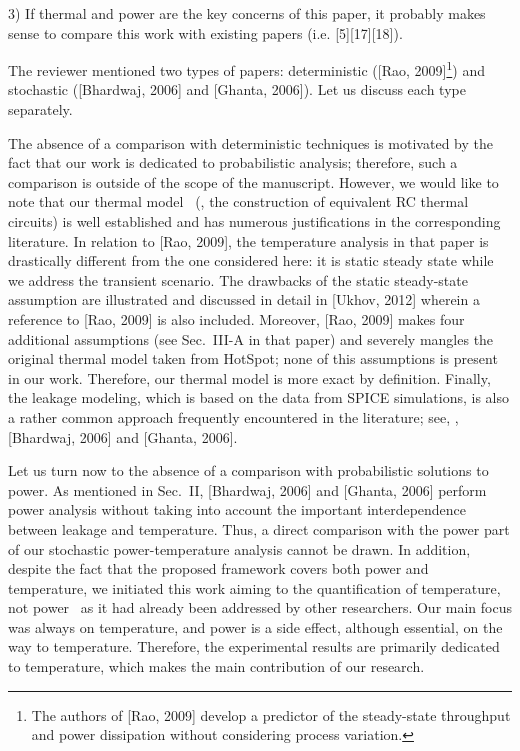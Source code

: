 \begin{reviewer}
3) If thermal and power are the key concerns of this paper, it probably makes sense to compare this work with existing papers (i.e. [5][17][18]).
\end{reviewer}
\begin{authors}
The reviewer mentioned two types of papers: deterministic ([Rao, 2009]\footnote{The authors of [Rao, 2009] develop a predictor of the steady-state throughput and power dissipation without considering process variation.}) and stochastic ([Bhardwaj, 2006] and [Ghanta, 2006]).
Let us discuss each type separately.

The absence of a comparison with deterministic techniques is motivated by the fact that our work is dedicated to probabilistic analysis; therefore, such a comparison is outside of the scope of the manuscript.
However, we would like to note that our thermal model \perse\ (\ie, the construction of equivalent RC thermal circuits) is well established and has numerous justifications in the corresponding literature.
In relation to [Rao, 2009], the temperature analysis in that paper is drastically different from the one considered here: it is static steady state while we address the transient scenario.
The drawbacks of the static steady-state assumption are illustrated and discussed in detail in [Ukhov, 2012] wherein a reference to [Rao, 2009] is also included.
Moreover, [Rao, 2009] makes four additional assumptions (see Sec.~III-A in that paper) and severely mangles the original thermal model taken from HotSpot; none of this assumptions is present in our work.
Therefore, our thermal model is more exact by definition.
Finally, the leakage modeling, which is based on the data from SPICE simulations, is also a rather common approach frequently encountered in the literature; see, \eg, [Bhardwaj, 2006] and [Ghanta, 2006].

Let us turn now to the absence of a comparison with probabilistic solutions to power.
As mentioned in Sec.~II, [Bhardwaj, 2006] and [Ghanta, 2006] perform power analysis without taking into account the important interdependence between leakage and temperature.
Thus, a direct comparison with the power part of our stochastic power-temperature analysis cannot be drawn.
In addition, despite the fact that the proposed framework covers both power and temperature, we initiated this work aiming to the quantification of temperature, not power \perse\ as it had already been addressed by other researchers.
Our main focus was always on temperature, and power is a side effect, although essential, on the way to temperature.
Therefore, the experimental results are primarily dedicated to temperature, which makes the main contribution of our research.


\end{authors}
